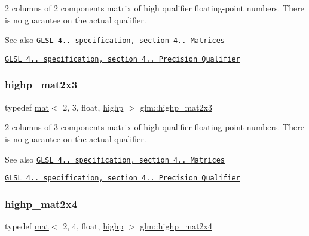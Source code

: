 2 columns of 2 components matrix of high qualifier floating-\/point numbers. There is no guarantee on the actual qualifier.

\begin{DoxySeeAlso}{See also}
\href{http://www.opengl.org/registry/doc/GLSLangSpec.4.20.8.pdf}{\tt G\+L\+SL 4.. specification, section 4.. Matrices} 

\href{http://www.opengl.org/registry/doc/GLSLangSpec.4.20.8.pdf}{\tt G\+L\+SL 4.. specification, section 4.. Precision Qualifier} 
\end{DoxySeeAlso}
\mbox{\label{group__core__precision_ga9d61903aea75d6932829cd049f2e622a}} 
\subsubsection{\texorpdfstring{highp\+\_\+mat2x3}{highp\_mat2x3}}
{\footnotesize\ttfamily typedef \mbox{\hyperlink{structglm_1_1mat}{mat}}$<$ 2, 3, float, \mbox{\hyperlink{namespaceglm_a36ed105b07c7746804d7fdc7cc90ff25ac6f7eab42eacbb10d59a58e95e362074}{highp}} $>$ \mbox{\hyperlink{group__core__precision_ga9d61903aea75d6932829cd049f2e622a}{glm\+::highp\+\_\+mat2x3}}}

2 columns of 3 components matrix of high qualifier floating-\/point numbers. There is no guarantee on the actual qualifier.

\begin{DoxySeeAlso}{See also}
\href{http://www.opengl.org/registry/doc/GLSLangSpec.4.20.8.pdf}{\tt G\+L\+SL 4.. specification, section 4.. Matrices} 

\href{http://www.opengl.org/registry/doc/GLSLangSpec.4.20.8.pdf}{\tt G\+L\+SL 4.. specification, section 4.. Precision Qualifier} 
\end{DoxySeeAlso}
\mbox{\label{group__core__precision_ga4ad5980b248b3d4dcf014db8fa4495cf}} 
\subsubsection{\texorpdfstring{highp\+\_\+mat2x4}{highp\_mat2x4}}
{\footnotesize\ttfamily typedef \mbox{\hyperlink{structglm_1_1mat}{mat}}$<$ 2, 4, float, \mbox{\hyperlink{namespaceglm_a36ed105b07c7746804d7fdc7cc90ff25ac6f7eab42eacbb10d59a58e95e362074}{highp}} $>$ \mbox{\hyperlink{group__core__precision_ga4ad5980b248b3d4dcf014db8fa4495cf}{glm\+::highp\+\_\+mat2x4}}}


